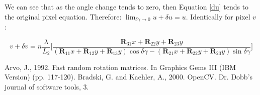 \documentclass[12pt]{article}
\newcommand{\mtx}[1]{\ensuremath{\mathbf{#1}}}
\begin{document}
We can see that as the angle change tends to zero, then Equation \ref{du} tends to the original pixel equation. Therefore: $\lim_{\delta\gamma \to 0} u + \delta u = u$. Identically for pixel $v$:

\begin{equation}\label{dv}
    v + \delta v = n\frac{\lambda}{L_2}
        \bigg[\frac{\mtx{R}_{31}x + \mtx{R}_{22}y + \mtx{R}_{23}y}
                   {(\mtx{R}_{11}x + \mtx{R}_{12}y + \mtx{R}_{13}y)\cos\delta\gamma -(\mtx{R}_{21}x + \mtx{R}_{22}y + \mtx{R}_{23}y)\sin\delta\gamma}                  
        \bigg]
\end{equation}

\begin{thebibliography}{9}
Arvo, J., 1992. Fast random rotation matrices. In Graphics Gems III (IBM Version) (pp. 117-120).
Bradski, G. and Kaehler, A., 2000. OpenCV. Dr. Dobb’s journal of software tools, 3.
\end{thebibliography}
\end{document}
